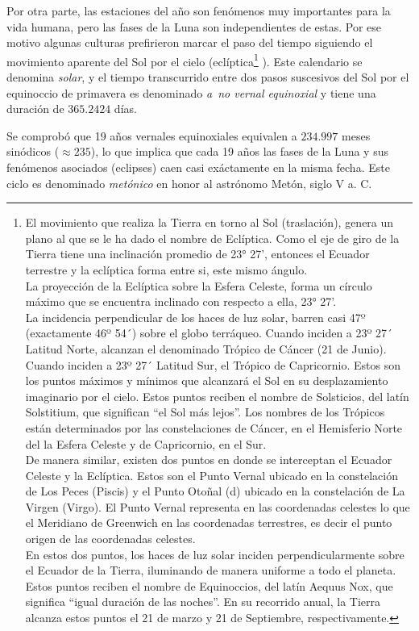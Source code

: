 Por otra parte, las estaciones del a\~no son fen\'omenos muy importantes para la vida humana, pero las fases de la Luna son independientes de estas. Por ese motivo algunas culturas prefirieron marcar el paso del tiempo siguiendo el movimiento aparente del Sol por el cielo (ecl\'iptica\footnote{El movimiento que realiza la Tierra en torno al Sol (traslación), genera un plano al que se le ha dado el nombre de Eclíptica. Como el eje de giro de la Tierra tiene una inclinación promedio de 23° 27', entonces el Ecuador terrestre y la eclíptica forma entre si, este mismo ángulo.\\La proyección de la Eclíptica sobre la Esfera Celeste, forma un círculo máximo que se encuentra inclinado con respecto a ella, 23° 27'.
\\ La incidencia perpendicular de los haces de luz solar, barren casi 47º (exactamente 46º 54´) sobre el globo terráqueo. Cuando inciden a 23º 27´ Latitud Norte, alcanzan el denominado Trópico de Cáncer (21 de Junio). Cuando inciden a 23º 27´ Latitud Sur, el Trópico de Capricornio. Estos son los puntos máximos y mínimos que alcanzará el Sol en su desplazamiento imaginario por el cielo. Estos puntos reciben el nombre de Solsticios, del latín Solstitium, que significan “el Sol más lejos”. Los nombres de los Trópicos están determinados por las constelaciones de Cáncer, en el Hemisferio Norte del la Esfera Celeste y de Capricornio, en el Sur.
\\ De manera similar, existen dos puntos en donde se interceptan el Ecuador Celeste y la Eclíptica. Estos son el Punto Vernal  ubicado en la constelación de Los Peces (Piscis) y el Punto Otoñal (d) ubicado en la constelación de La Virgen (Virgo). El Punto Vernal representa en las coordenadas celestes lo que el Meridiano de Greenwich en las coordenadas terrestres, es decir el punto origen de las coordenadas celestes.
\\ En estos dos puntos, los haces de luz solar inciden perpendicularmente sobre el Ecuador de la Tierra, iluminando de manera uniforme a todo el planeta. Estos puntos reciben el nombre de Equinoccios, del latín Aequus Nox, que significa “igual duración de las noches”. En su recorrido anual, la Tierra alcanza estos puntos el 21 de marzo y 21 de Septiembre, respectivamente. }
). Este calendario se denomina \emph{solar}, y el tiempo transcurrido entre dos pasos suscesivos del Sol por el equinoccio de primavera es denominado \emph{a~no vernal equinoxial} y tiene una duraci\'on de $365.2424$ d\'ias.

Se comprob\'o que  19 a\~nos vernales equinoxiales equivalen a $234.997$ meses sin\'odicos ($\approx 235$), lo que implica que cada 19 a\~nos las fases de la Luna y sus fen\'omenos asociados (eclipses) caen casi ex\'actamente en la misma fecha. Este ciclo es denominado \emph{met\'onico} en honor al astr\'onomo Met\'on, siglo V a. C.

